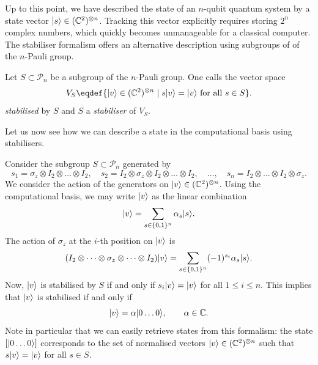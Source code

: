 \documentclass[a4paper, oneside, 12pt]{amsart}
\newcommand*{\PauliGroup}{\ensuremath{\mathcal{P}}}
\begin{document}
Up to this point, we have described the state of an \(n\)-qubit quantum system by a state vector \(\lvert s\rangle \in (\mathbb{C}^2)^{\otimes n}\).
Tracking this vector explicitly requires storing \(2^n\) complex numbers, which quickly becomes unmanageable for a classical computer.
The stabiliser formalism offers an alternative description using subgroups of of the \( n \)-Pauli group.

\begin{definition}\label{def:stabiliser-subspace-subgroup}
  Let \( S \subset \PauliGroup_n \) be a subgroup of the \( n \)-Pauli group.
  One calls the vector space
  \begin{equation}
    V_{S} \eqdef \{\ket{v}\in (\mathbb{C}^{2})^{\otimes n}\mid s\ket{v} = \ket{v} \text{ for all }s\in S\}.
  \end{equation}
  \emph{stabilised} by \(S\) and \(S\) a \emph{stabiliser} of \(V_{S}\).
\end{definition}

Let us now see how we can describe a state in the computational basis using stabilisers.

\begin{example}\label{ex:ket-0-state}
  Consider the subgroup \( S \subset \PauliGroup_n \) generated by
  \begin{equation*}
       s_{1} = \sigma_z  \otimes I_2 \otimes \dots \otimes I_2, \quad s_{2}=I_2 \otimes \sigma_z \otimes I_{2}\otimes \dots \otimes I_2, \quad \dots, \quad s_{n}=I_2 \otimes \dots \otimes I_{2}\otimes  \sigma_z.
 \end{equation*}
 We consider the action of the generators on \( \lvert v\rangle \in (\mathbb{C}^2)^{\otimes n} \).
 Using the computational basis, we may write \(\lvert v\rangle\) as the linear combination
 \begin{equation*}
     \lvert v\rangle = \sum_{s \in \{0,1\}^n} \alpha_s \lvert s\rangle.
 \end{equation*}
   The action of \( \sigma_z \) at the \( i \)-th position on \( \lvert v\rangle \) is
   \begin{equation*}
    (I_2 \otimes \dots \otimes \sigma_z \otimes \dots \otimes I_2) \lvert v\rangle = \sum_{s \in \{0,1\}^n} (-1)^{s_i} \alpha_s \lvert s\rangle.
  \end{equation*}
  Now, \(\lvert v\rangle\) is stabilised by \(S\) if and only if \(s_{i}\lvert v\rangle=\lvert v\rangle\) for all \(1\leq i \leq n\).
  This implies that \(\lvert v\rangle\) is stabilised if and only if
  \begin{equation*}
      \lvert v\rangle = \alpha \lvert0 \dots 0\rangle, \qquad \alpha\in \mathbb{C}.
  \end{equation*}
  Note in particular that we can easily retrieve states from this formalism:
  the state \([\lvert0 \dots 0\rangle]\) corresponds to the set of normalised vectors \(\lvert v\rangle\in ( \mathbb{C}^{2})^{\otimes n}\) such that \(s\lvert v\rangle =\lvert v\rangle\) for all \(s\in S\).
\end{example}
\end{document}
